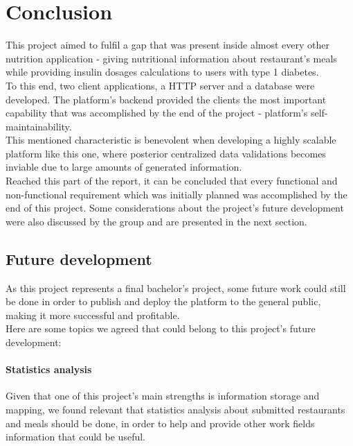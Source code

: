 \chapter{Conclusion}

This project aimed to fulfil a gap that was present inside almost every other nutrition application - 
giving nutritional information about restaurant's meals while providing insulin dosages calculations
to users with type 1 diabetes.\\

To this end, two client applications, a HTTP server and a database were developed.
The platform's backend provided the clients the most important capability that was accomplished by the end
of the project - platform's self-maintainability.\\

This mentioned characteristic is benevolent when developing a highly scalable platform like this one,
where posterior centralized data validations becomes inviable due to large amounts of generated information.\\

Reached this part of the report, it can be concluded that every functional and non-functional requirement which 
was initially planned was accomplished by the end of this project. Some considerations about the project's future
development were also discussed by the group and are presented in the next section.\\

\section{Future development}

As this project represents a final bachelor's project, some future work could still be done in order
to publish and deploy the platform to the general public, making it more successful and profitable.\\

Here are some topics we agreed that could belong to this project's future development:

\subsubsection{Statistics analysis}

Given that one of this project's main strengths is information storage and mapping, we found
relevant that statistics analysis about submitted restaurants and meals should be done, 
in order to help and provide other work fields information that could be useful.\\

